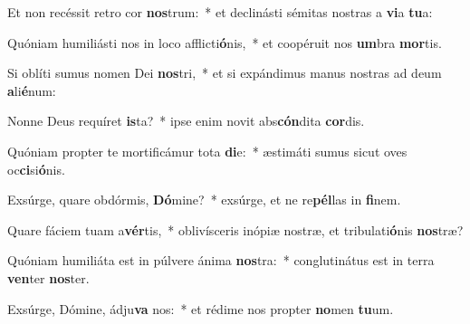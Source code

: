 \item Et non recéssit retro cor \textbf{nos}trum:~* et declinásti sémitas nostras a \textbf{vi}a \textbf{tu}a:
\item Quóniam humiliásti nos in loco afflicti\textbf{ó}nis,~* et coopéruit nos \textbf{um}bra \textbf{mor}tis.
\item Si oblíti sumus nomen Dei \textbf{nos}tri,~* et si expándimus manus nostras ad deum \textbf{a}li\textbf{é}num:
\item Nonne Deus requíret \textbf{is}ta?~* ipse enim novit abs\textbf{cón}dita \textbf{cor}dis.
\item Quóniam propter te mortificámur tota \textbf{di}e:~* æstimáti sumus sicut oves oc\textbf{ci}si\textbf{ó}nis.
\item Exsúrge, quare obdórmis, \textbf{Dó}mine?~* exsúrge, et ne re\textbf{pél}las in \textbf{fi}nem.
\item Quare fáciem tuam a\textbf{vér}tis,~* oblivísceris inópiæ nostræ, et tribulati\textbf{ó}nis \textbf{nos}træ?
\item Quóniam humiliáta est in púlvere ánima \textbf{nos}tra:~* conglutinátus est in terra \textbf{ven}ter \textbf{nos}ter.
\item Exsúrge, Dómine, ádju\textbf{va} nos:~* et rédime nos propter \textbf{no}men \textbf{tu}um.
